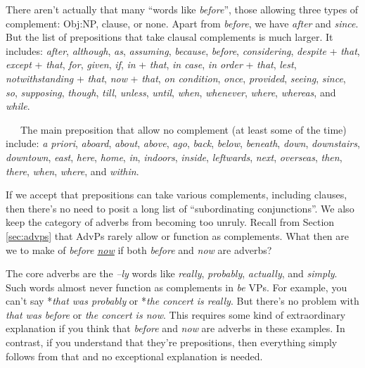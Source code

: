 \begin{tcolorbox}[title=Words like \textit{before}, colback=white]
   There aren't actually that many  ``words like \textit{before}'', those allowing three types of complement: Obj:NP, clause, or none. Apart from \textit{before}, we have \textit{after} and \textit{since}. But the list of prepositions that take clausal complements is much larger. It includes: \textit{after}, \textit{although}, \textit{as}, \textit{assuming}, 
       \textit{because}, \textit{before}, 
       \textit{considering}, 
       \textit{despite} + \textit{that}, 
       \textit{except} + \textit{that}, 
       \textit{for},
       \textit{given}, 
       \textit{if}, \textit{in} + \textit{that}, \textit{in case}, \textit{in order} + \textit{that}, 
       \textit{lest}, \textit{notwithstanding} + \textit{that}, \textit{now} + \textit{that}, \textit{on condition}, \textit{once}, 
       \textit{provided}, \textit{seeing}, \textit{since}, \textit{so}, \textit{supposing}, 
       \textit{though}, \textit{till}, 
       \textit{unless}, \textit{until}, 
       \textit{when}, \textit{whenever}, \textit{where}, \textit{whereas}, and \textit{while}.

   ~~~The main preposition that allow no complement (at least some of the time) include:
   \textit{a priori}, \textit{aboard}, \textit{about}, \textit{above}, \textit{ago}, \textit{back}, \textit{below}, \textit{beneath}, \textit{down}, \textit{downstairs}, \textit{downtown}, \textit{east}, \textit{here}, \textit{home}, \textit{in}, \textit{indoors}, \textit{inside}, \textit{leftwards}, \textit{next}, \textit{overseas}, \textit{then}, \textit{there}, \textit{when}, \textit{where}, and \textit{within}.
\end{tcolorbox}

If we accept that prepositions can take various complements, including clauses, then there's no need to posit a long list of ``subordinating conjunctions''. We also keep the category of adverbs from becoming too unruly. Recall from Section \ref{sec:advps} that AdvPs rarely allow or function as complements. What then are we to make of \textit{before \uline{now}} if both \textit{before} and \textit{now} are adverbs? 

The core adverbs are the \textit{--ly} words like \textit{really}, \textit{probably}, \textit{actually}, and \textit{simply}. Such words almost never function as complements in \textit{be} VPs. For example, you can't say *\textit{that was probably} or *\textit{the concert is really}. But there's no problem with \textit{that was before} or \textit{the concert is now}. This requires some kind of extraordinary explanation if you think that \textit{before} and \textit{now} are adverbs in these examples. In contrast, if you understand that they're prepositions, then everything simply follows from that and no exceptional explanation is needed.

